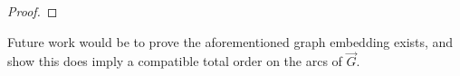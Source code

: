 \documentclass[12pt,letterpaper,oneside]{book}
\newcommand{\key}{\textbf{key}}
\newcommand{\smaller}{\textbf{smaller}}
\newcommand{\xcor}{\textbf{x}}
\begin{document}
\begin{proof}


\end{proof}







Future work would be to prove the aforementioned graph embedding exists, and show this does imply a compatible total order on the arcs 
of $\vec{G}$.  
\end{document}

